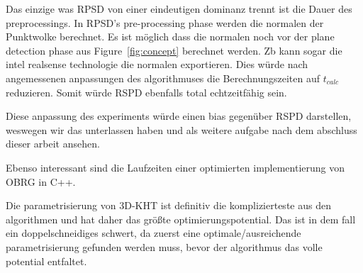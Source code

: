 \documentclass[main.tex]{subfiles}
\begin{document}
Das einzige was RPSD von einer eindeutigen dominanz trennt ist die Dauer des preprocessings.
In RPSD's pre-processing phase werden die normalen der Punktwolke berechnet. 
Es ist möglich dass die normalen noch vor der plane detection phase aus Figure~\ref{fig:concept}
berechnet werden. Zb kann sogar die intel realsense technologie die normalen exportieren.
Dies würde nach angemessenen anpassungen des algorithmuses die Berechnungszeiten auf $t_{calc}$
reduzieren. Somit würde RSPD ebenfalls total echtzeitfähig sein. 


Diese anpassung des experiments würde einen bias gegenüber RSPD darstellen, weswegen wir das 
unterlassen haben und als weitere aufgabe nach dem abschluss dieser arbeit ansehen.

Ebenso interessant sind die Laufzeiten einer optimierten implementierung von OBRG in C++.

Die parametrisierung von 3D-KHT ist definitiv die komplizierteste aus den algorithmen und hat daher
das größte optimierungspotential. Das ist in dem fall ein doppelschneidiges schwert, da zuerst eine
optimale/ausreichende parametrisierung gefunden werden muss, bevor der algorithmus das volle potential 
entfaltet. 
\end{document}

